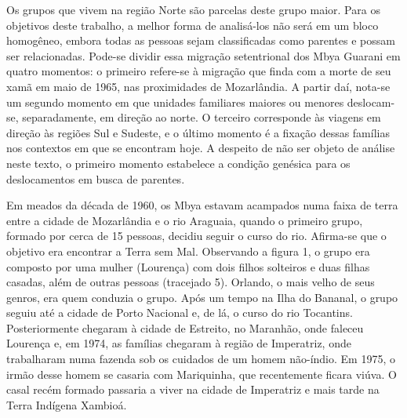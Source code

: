 Os grupos que vivem na região Norte são parcelas deste grupo maior. Para
os objetivos deste trabalho, a melhor forma de analisá-los não será em
um bloco homogêneo, embora todas as pessoas sejam classificadas como
parentes e possam ser relacionadas. Pode-se dividir essa migração
setentrional dos Mbya Guarani em quatro momentos: o primeiro refere-se
à migração que finda com a morte de seu xamã em maio de 1965, nas
proximidades de Mozarlândia. A partir daí, nota-se um segundo momento
em que unidades familiares maiores ou menores deslocam-se,
separadamente, em direção ao norte. O terceiro corresponde às viagens
em direção às regiões Sul e Sudeste, e o último momento é a fixação
dessas famílias nos contextos em que se encontram hoje. A despeito de
não ser objeto de análise neste texto, o primeiro momento estabelece a
condição genésica para os deslocamentos em busca de parentes.

Em meados da década de 1960, os Mbya estavam acampados numa faixa de
terra entre a cidade de Mozarlândia e o rio Araguaia, quando o primeiro
grupo, formado por cerca de 15 pessoas, decidiu seguir o curso do rio.
Afirma-se que o objetivo era encontrar a Terra sem Mal. Observando a
figura 1, o grupo era composto por uma mulher (Lourença) com dois
filhos solteiros e duas filhas casadas, além de outras pessoas
(tracejado 5). Orlando, o mais velho de seus genros, era quem conduzia
o grupo. Após um tempo na Ilha do Bananal, o grupo seguiu até a cidade
de Porto Nacional e, de lá, o curso do rio Tocantins. Posteriormente
chegaram à cidade de Estreito, no Maranhão, onde faleceu Lourença e, em
1974, as famílias chegaram à região de Imperatriz, onde trabalharam
numa fazenda sob os cuidados de um homem não-índio. Em 1975, o irmão
desse homem se casaria com Mariquinha, que recentemente ficara viúva. O
casal recém formado passaria a viver na cidade de Imperatriz e mais
tarde na Terra Indígena Xambioá. 

